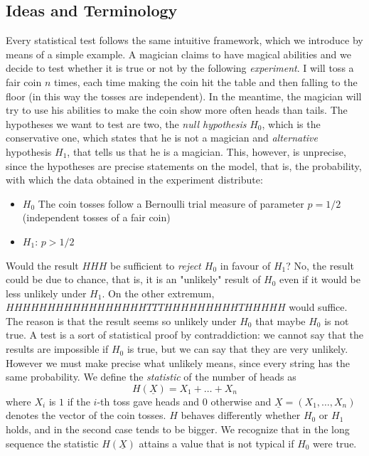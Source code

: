 	\subsection{ Ideas and Terminology}
	Every statistical test follows the same intuitive framework, which we introduce by means of a simple example. A magician claims to have magical abilities and we decide to test whether it is true or not by the following \emph{experiment}. I will toss a fair coin $n$ times, each time making the coin hit the table and then falling to the floor (in this way the tosses are independent). In the meantime, the magician will try to use his abilities to make the coin show more often heads than tails.
	The hypotheses we want to test are two, the \emph{null hypothesis} $H_0$, which is the conservative one, which states that he is not a magician and \emph{alternative} hypothesis $H_1$, that tells us that he is a magician. This, however, is unprecise, since the hypotheses are precise statements on the model, that is, the probability, with which the data obtained in the experiment distribute: 
	\begin{itemize}
		\item  $H_0$ The coin tosses follow a Bernoulli trial measure of parameter $p = 1/2$ (independent tosses of a fair coin)
		\item $H_1$: $p>1/2$
	\end{itemize}
	Would the result $HHH$ be sufficient to \emph{reject $H_0$ } in favour of $H_1$? No, the result could be due to chance, that is, it is an "unlikely" result of $H_0$ even if it would be less unlikely under $H_1$. 
	On the other extremum, $HHHHHHHHHHHHHHHHHTTTHHHHHHHHHTHHHHH$ would suffice. The reason is that the result seems so unlikely under $H_0$ that maybe $H_0$ is not true. A test is a sort of statistical proof by contraddiction: we cannot say that the results are impossible if $H_0$ is true, but we can say that they are very unlikely. \\
	However we must make precise what unlikely means, since every string has the same probability. We define the \emph{statistic} of the number of heads as 
	\begin{equation}
		\label{e:heads_numbers}
		H(\underline X) = X_1 + \ldots + X_n
	\end{equation}
	where $X_i$ is $1$ if the $i$-th toss gave heads and $0$ otherwise and $\underline X= (X_1, \ldots, X_n)$ denotes the vector of the coin tosses. $H$ behaves differently whether $H_0$ or $H_1$ holds, and in the second case tends to be bigger. We recognize that in the long sequence the statistic $H(\underline X)$ attains a value that is not typical if $H_0$ were true.\\
